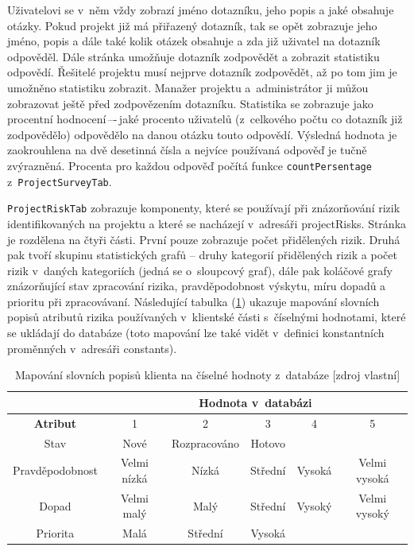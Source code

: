Uživatelovi se v~něm vždy zobrazí jméno dotazníku, jeho popis a jaké obsahuje otázky. Pokud projekt již má přiřazený dotazník, tak se opět zobrazuje jeho jméno, popis a dále také kolik otázek obsahuje a zda již uživatel na dotazník odpověděl. Dále stránka umožňuje dotazník zodpovědět a zobrazit statistiku odpovědí. Řešitelé projektu musí nejprve dotazník zodpovědět, až po tom jim je umožněno statistiku zobrazit. Manažer projektu a~administrátor ji můžou zobrazovat ještě před zodpovězením dotazníku. Statistika se zobrazuje jako procentní hodnocení\,–-\,jaké procento uživatelů (z~celkového počtu co dotazník již zodpovědělo) odpovědělo na danou otázku touto odpovědí. Výsledná hodnota je zaokrouhlena na dvě desetinná čísla a nejvíce používaná odpověď je tučně zvýrazněná. Procenta pro každou odpověď počítá funkce \texttt{countPersentage} z~\texttt{ProjectSurveyTab}.
    
\texttt{ProjectRiskTab} zobrazuje komponenty, které se používají při znázorňování rizik identifikovaných na projektu a které se nacházejí v~adresáři projectRisks. Stránka je rozdělena na čtyři části. První pouze zobrazuje počet přidělených rizik. Druhá pak tvoří skupinu statistických grafů – druhy kategorií přidělených rizik a počet rizik v~daných kategoriích (jedná se o~sloupcový graf), dále pak koláčové grafy znázorňující stav zpracování rizika, pravděpodobnost výskytu, míru dopadů a prioritu při zpracovávaní. Následující tabulka (\ref{tableMaps}) ukazuje mapování slovních popisů atributů rizika používaných v~klientské části s~číselnými hodnotami, které se ukládají do databáze (toto mapování lze také vidět v~definici konstantních proměnných v~adresáři constants).

\begin{table}[h]
\begin{tabular}{|c|c|c|c|c|c|}
\hline
                 & \multicolumn{5}{c|}{\textbf{Hodnota v~databázi}}             \\ \hline
\textbf{Atribut} & 1           & 2            & 3       & 4      & 5            \\ \hline
Stav             & Nové        & Rozpracováno & Hotovo  &        &              \\ \hline
Pravděpodobnost  & Velmi nízká & Nízká        & Střední & Vysoká & Velmi vysoká \\ \hline
Dopad            & Velmi malý  & Malý         & Střední & Vysoký & Velmi vysoký \\ \hline
Priorita         & Malá        & Střední      & Vysoká  &        &              \\ \hline
\end{tabular}
\caption{Mapování slovních popisů klienta na číselné hodnoty z~databáze [zdroj vlastní]}
\label{tableMaps}
\end{table}

